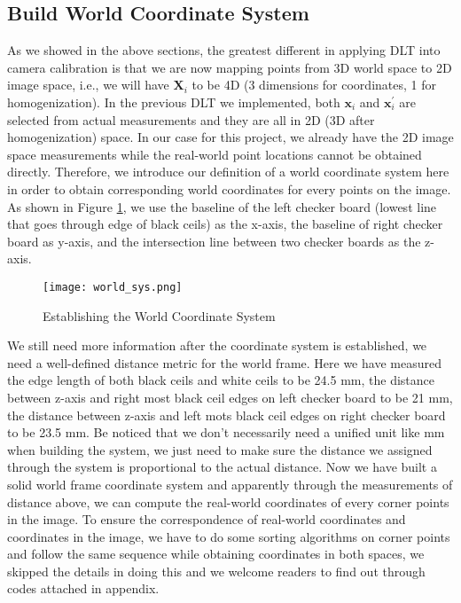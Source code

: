 \documentclass[conference]{IEEEtran}
\newcommand{\mat}[1]{\mathbf{#1}} %
\begin{document}
\subsection{Build World Coordinate System}
As we showed in the above sections, the greatest different in applying DLT into camera calibration is that we are now mapping points from 3D world space to 2D image space, i.e., we will have $\mat{X}_i$ to be 4D (3 dimensions for coordinates, 1 for homogenization). In the previous DLT we implemented, both $\mat{x}_i$ and $\mat{x}_i^\prime$ are selected from actual measurements and they are all in 2D (3D after homogenization) space. In our case for this project, we already have the 2D image space measurements while the real-world point locations cannot be obtained directly. Therefore, we introduce our definition of a world coordinate system here in order to obtain corresponding world coordinates for every points on the image. As shown in Figure \ref{world_sys}, we use the baseline of the left checker board (lowest line that goes through edge of black ceils) as the x-axis, the baseline of right checker board as y-axis, and the intersection line between two checker boards as the z-axis.
\begin{figure}
  \centering \texttt{[image: world\_sys.png]}
  \caption{Establishing the World Coordinate System}
  \label{world_sys}
\end{figure}

We still need more information after the coordinate system is established, we need a well-defined distance metric for the world frame. Here we have measured the edge length of both black ceils and white ceils to be 24.5 mm, the distance between z-axis and right most black ceil edges on left checker board to be 21 mm, the distance between z-axis and left mots black ceil edges on right checker board to be 23.5 mm. Be noticed that we don't necessarily need a unified unit like mm when building the system, we just need to make sure the distance we assigned through the system is proportional to the actual distance. Now we have built a solid world frame coordinate system and apparently through the measurements of distance above, we can compute the real-world coordinates of every corner points in the image. To ensure the correspondence of real-world coordinates and coordinates in the image, we have to do some sorting algorithms on corner points and follow the same sequence while obtaining coordinates in both spaces, we skipped the details in doing this and we welcome readers to find out through codes attached in appendix.
\end{document}
